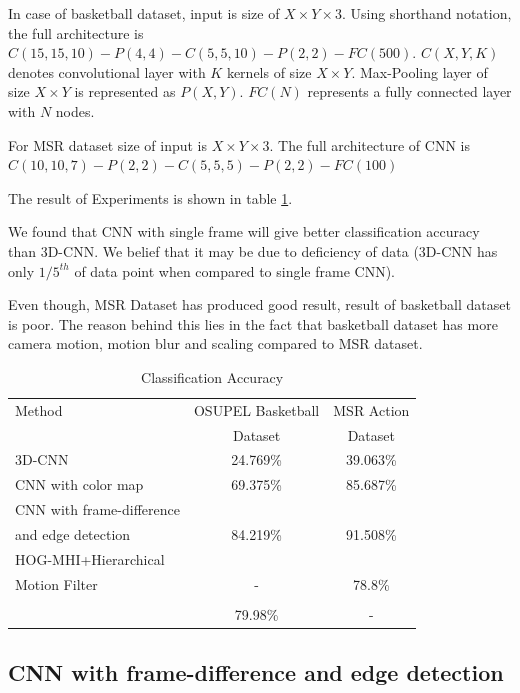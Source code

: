 In case of basketball dataset, input is size of $X \times Y \times 3$. Using shorthand notation, the full architecture is $C(15, 15, 10)-P(4, 4)-C(5, 5, 10)-P(2, 2)-FC(500)$. $C(X, Y, K)$ denotes convolutional layer with $K$ kernels of size $X \times Y$. Max-Pooling layer of size $X \times Y$ is represented as $P(X,Y)$. $FC(N)$ represents a fully connected layer with $N$ nodes. 

For MSR dataset size of input is $X \times Y \times 3$. The full architecture of CNN is $C(10, 10, 7)-P(2, 2)-C(5, 5, 5)-P(2, 2)-FC(100)$

The result of Experiments is shown in table \ref{table:cnn_res}.

We found that CNN with single frame will give better classification accuracy than 3D-CNN. We belief that it may be due to deficiency of data (3D-CNN has only $1/5^{th}$ of data point when compared to single frame CNN).

Even though, MSR Dataset has produced good result, result of basketball dataset is poor. The reason behind this lies in the fact that basketball dataset has more camera motion, motion blur and scaling compared to MSR dataset.

\begin{table}[h]
\centering
\begin{tabular}{|l|c|c|}
\hline
Method & OSUPEL Basketball& MSR Action\\
       & Dataset          &Dataset \\
\hline
\hline
3D-CNN  &24.769\%   &39.063\% \\
\hline
CNN with color map  &69.375\%   &85.687\% \\
\hline
CNN with frame-difference &&\\
and edge detection &84.219\%   &91.508\% \\
\hline
HOG-MHI+Hierarchical &&\\
Motion Filter  & -  &78.8\% \\
\hline
 &&\\
 & 79.98\%   & - \\
\hline  
\end{tabular}
\caption[Classification Accuracy]{Classification Accuracy}
\label{table:cnn_res}
\end{table} 

\subsection{CNN with frame-difference and edge detection}

